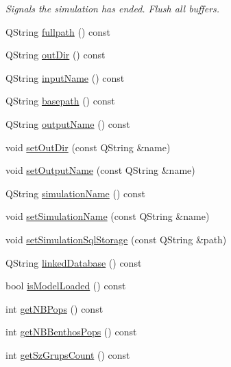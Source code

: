 \begin{DoxyCompactItemize}
\begin{DoxyCompactList}\small\item\em Signals the simulation has ended. Flush all buffers. \end{DoxyCompactList}\item 
Q\+String \mbox{\hyperlink{class_displace_model_a137b0bd76c221bc6281555ba3d7af446}{fullpath}} () const
\item 
Q\+String \mbox{\hyperlink{class_displace_model_aaa29a071ab771fa51e2d285d7e8ba0fd}{out\+Dir}} () const
\item 
Q\+String \mbox{\hyperlink{class_displace_model_ace9000588aa6ac9fa1d80eb0b1dedd3a}{input\+Name}} () const
\item 
Q\+String \mbox{\hyperlink{class_displace_model_aa8fa2854364ea575cd28871442314b66}{basepath}} () const
\item 
Q\+String \mbox{\hyperlink{class_displace_model_a18dd33b709f112808f471edd0bc3a36a}{output\+Name}} () const
\item 
void \mbox{\hyperlink{class_displace_model_a8ea114f697f6470d535466555f67c17e}{set\+Out\+Dir}} (const Q\+String \&name)
\item 
void \mbox{\hyperlink{class_displace_model_ad86ebbb9f346a4b14545c39e8c635946}{set\+Output\+Name}} (const Q\+String \&name)
\item 
Q\+String \mbox{\hyperlink{class_displace_model_a836396799089957b340a4da985550f02}{simulation\+Name}} () const
\item 
void \mbox{\hyperlink{class_displace_model_acbf07beebc94de38d6408d5911c78a5c}{set\+Simulation\+Name}} (const Q\+String \&name)
\item 
void \mbox{\hyperlink{class_displace_model_a8a6589d9bf211415457b337d920e09d3}{set\+Simulation\+Sql\+Storage}} (const Q\+String \&path)
\item 
Q\+String \mbox{\hyperlink{class_displace_model_a14426444e50559bb6f1842dd28561cfe}{linked\+Database}} () const
\item 
bool \mbox{\hyperlink{class_displace_model_a217ded0dcc9ac65b30edb69b05cfb233}{is\+Model\+Loaded}} () const
\item 
int \mbox{\hyperlink{class_displace_model_a2ccd48a91532db0c5f5f105249aab605}{get\+N\+B\+Pops}} () const
\item 
int \mbox{\hyperlink{class_displace_model_a3092d43ebcf8f284d0cd005c9997acc8}{get\+N\+B\+Benthos\+Pops}} () const
\item 
int \mbox{\hyperlink{class_displace_model_a4724bde7911600c7e81895f81f57f76f}{get\+Sz\+Grups\+Count}} () const

\end{DoxyCompactItemize}

